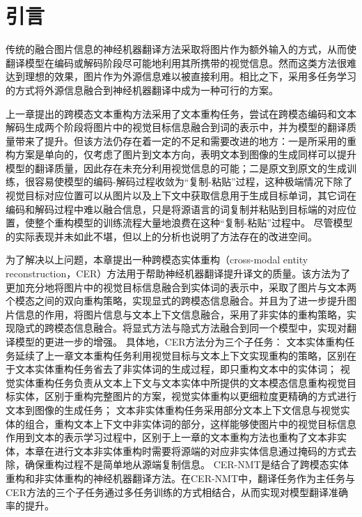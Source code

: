 \section{引言}
传统的融合图片信息的神经机器翻译方法采取将图片作为额外输入的方式，从而使翻译模型在编码或解码阶段尽可能地利用其所携带的视觉信息。然而这类方法很难达到理想的效果，图片作为外源信息难以被直接利用。相比之下，采用多任务学习的方式将外源信息融合到神经机器翻译中成为一种可行的方案。


上一章提出的跨模态文本重构方法采用了文本重构任务，尝试在跨模态编码和文本解码生成两个阶段将图片中的视觉目标信息融合到词的表示中，并为模型的翻译质量带来了提升。但该方法仍存在着一定的不足和需要改进的地方：一是所采用的重构方案是单向的，仅考虑了图片到文本方向，表明文本到图像的生成同样可以提升模型的翻译质量，因此存在未充分利用视觉信息的可能；二是原文到原文的生成训练，很容易使模型的编码-解码过程收敛为“复制-粘贴”过程，这种极端情况下除了视觉目标对应位置可以从图片以及上下文中获取信息用于生成目标单词，其它词在编码和解码过程中难以融合信息，只是将源语言的词复制并粘贴到目标端的对应位置，使整个重构模型的训练流程大量地浪费在这种“复制-粘贴”过程中。
尽管模型的实际表现并未如此不堪，但以上的分析也说明了方法存在的改进空间。

为了解决以上问题，本章提出一种跨模态实体重构（cross-modal entity reconstruction，CER）方法用于帮助神经机器翻译提升译文的质量。该方法为了更加充分地将图片中的视觉目标信息融合到实体词的表示中，采取了图片与文本两个模态之间的双向重构策略，实现显式的跨模态信息融合。并且为了进一步提升图片信息的作用，将图片信息与文本上下文信息融合，采用了非实体的重构策略，实现隐式的跨模态信息融合。将显式方法与隐式方法融合到同一个模型中，实现对翻译模型的更进一步的增强。
具体地，CER方法分为三个子任务：
文本实体重构任务延续了上一章文本重构任务利用视觉目标与文本上下文实现重构的策略，区别在于文本实体重构任务省去了非实体词的生成过程，即只重构文本中的实体词；
视觉实体重构任务负责从文本上下文与文本实体中所提供的文本模态信息重构视觉目标实体，区别于重构完整图片的方案，视觉实体重构以更细粒度更精确的方式进行文本到图像的生成任务；
文本非实体重构任务采用部分文本上下文信息与视觉实体的组合，重构文本上下文中非实体词的部分，这样能够使图片中的视觉目标信息作用到文本的表示学习过程中，区别于上一章的文本重构方法也重构了文本非实体，本章在进行文本非实体重构时需要将源端的对应非实体信息通过掩码的方式去除，确保重构过程不是简单地从源端复制信息。
CER-NMT是结合了跨模态实体重构和非实体重构的神经机器翻译方法。在CER-NMT中，翻译任务作为主任务与CER方法的三个子任务通过多任务训练的方式相结合，从而实现对模型翻译准确率的提升。

